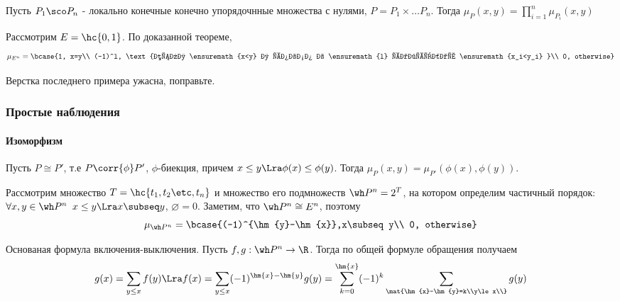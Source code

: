 \documentclass[unicode, 10pt, a4paper, oneside, fleqn]{article}
\begin{document}
\begin{imp}
  Пусть $P_1\sco P_n$ - локально конечные конечно упорядочнные 
  множества с нулями, $P=P_1\times\dots P_n$. Тогда $\displaystyle \mu_P(x,y) = \prod_{i=1}^n\mu_{P_i}(x,y)$
\end{imp}
\begin{ex}
  Рассмотрим $E=\hc{0, 1}$. По доказанной теореме, 
  \begin{displaymath}
    \mu_{E^n}=\bcase
       {1, x=y\\
         (-1)^l, \text{если \ensuremath{x<y} и ровно в \ensuremath{l} разрядах \ensuremath{x_i<y_i} }\\
         0, otherwise}
  \end{displaymath}
\end{ex}
\begin{authornote}
  Верстка последнего примера ужасна, поправьте.
\end{authornote}
\subsubsection{Простые наблюдения}
\paragraph{Изоморфизм}
Пусть $P\cong P'$, т.е $P\corr{\phi}P'$, $\phi$-биекция, причем $x\le y \Lra \phi(x)\le\phi(y)$.
Тогда $\mu_P(x,y)=\mu_{P'}(\phi(x),\phi(y))$.
\begin{ex}
  Рассмотрим множество $T=\hc{\set[t]{n}}$ и множество его подмножеств $\wh P^n = 2^T$, на котором 
  определим частичный порядок: $\forall x,y\in\wh P^n$ $x\le y \Lra x\subseq y$, $\varnothing = 0$.
  Заметим, что $\wh P^n \cong E^n$, поэтому
  \begin{displaymath}
    \mu_{\wh P^n}=\bcase{(-1)^{\hm{y}-\hm{x}},x\subseq y\\ 0, otherwise}
  \end{displaymath}
\end{ex}
\begin{imp}
  Основаная формула включения-выключения. Пусть $f,g:\wh P^n\to\R$. Тогда по общей формуле обращения
  получаем
  \begin{displaymath}
    g(x) = \sum_{y\le x}f(y) \Lra f(x)=\sum_{y\le x}(-1)^{\hm{x}-\hm{y}}g(y)=\sum_{k=0}^{\hm{x}}(-1)^k\sum_{ \tiny\mat{\hm{x}-\hm{y}=k\\y\le x\\}}g(y)
  \end{displaymath}
\end{imp}
\end{document}
